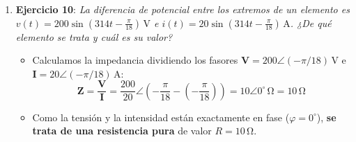 \begin{ejercicio}
\begin{enumerate}
    \item \textbf{Ejercicio 10}: \emph{La diferencia de potencial entre los extremos de un elemento es $v(t) = 200\sin\left(314 t - \frac{\pi}{18}\right)\,\si{\volt}$ e $i(t) = 20\sin\left(314 t - \frac{\pi}{18}\right)\,\si{\ampere}$. ¿De qué elemento se trata y cuál es su valor?}
    \begin{itemize}
        \item Calculamos la impedancia dividiendo los fasores $\mathbf{V} = 200\angle(-\pi/18)\,\si{\volt}$ e $\mathbf{I} = 20\angle(-\pi/18)\,\si{\ampere}$:
        \begin{equation*}
            \mathbf{Z} = \frac{\mathbf{V}}{\mathbf{I}} = \frac{200}{20}\angle\left(-\frac{\pi}{18} - \left(-\frac{\pi}{18}\right)\right) = 10\angle 0^\circ\,\si{\ohm} = 10\,\si{\ohm}
        \end{equation*}
        \item Como la tensión y la intensidad están exactamente en fase ($\varphi = 0^\circ$), \textbf{se trata de una resistencia pura} de valor $\boxed{R = 10\,\si{\ohm}}$.
    \end{itemize}
\end{enumerate}
\end{ejercicio}

